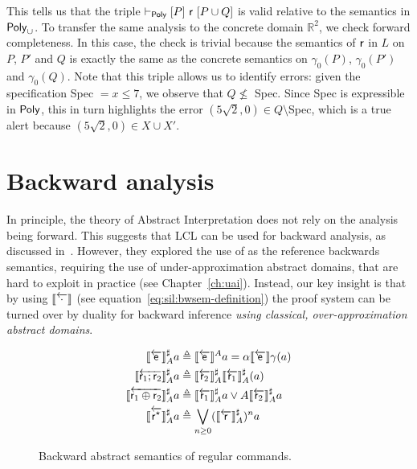 \begin{example}
	This tells us that the triple $\vdash_{\mathsf{Poly}}\nobreak[P]~\mathsf{r}~[P \cup Q]$ is valid relative to the semantics in $\mathsf{Poly}_{\cup}$. To transfer the same analysis to the concrete domain $\mathbb{R}^2$, we  check forward completeness. In this case, the check is trivial because the semantics of $\mathsf{r}$ in $L$ on $P$, $P'$ and $Q$ is exactly the same as the concrete semantics on $\gamma_0(P)$, $\gamma_0(P')$ and $\gamma_0(Q)$.
	Note that this triple allows us to identify errors: given the specification Spec $= x \le 7$, we observe that $Q \nleq $ Spec. Since Spec is expressible in $\mathsf{Poly}$, this in turn highlights the error $(5 \sqrt{2}, 0) \in Q \setminus $Spec, which is a true alert because $(5 \sqrt{2}, 0) \in X \cup X'$.
\end{example}

\section{Backward analysis}\label{sec:lcla:backward}
In principle, the theory of Abstract Interpretation does not rely on the analysis being forward. This suggests that LCL can be used for backward analysis, as discussed in~\cite[\S 5.3]{BGGR23}. However, they explored the use of \wlp{} as the reference backwards semantics, requiring the use of under\hyp{}approximation abstract domains, that are hard to exploit in practice (see Chapter~\ref{ch:uai}).
Instead, our key insight is that by using $\llbracket\overleftarrow{\cdot}\rrbracket$ (see equation~\eqref{eq:sil:bwsem-definition}) the proof system can be turned over by duality for backward inference \emph{using classical, over-approximation abstract domains}.

\begin{figure}
	\begin{align*}
		\llbracket\overleftarrow{\mathsf{e}}\rrbracket^{\sharp}_{A} a                    & \triangleq \llbracket\overleftarrow{\mathsf{e}}\rrbracket^{A} a = \alpha \llbracket\overleftarrow{\mathsf{e}}\rrbracket \gamma (a)                \\
		\llbracket\overleftarrow{\mathsf{r}_1 ; \mathsf{r}_2}\rrbracket^{\sharp}_{A} a        & \triangleq \llbracket\overleftarrow{\mathsf{r}_2}\rrbracket^{\sharp}_{A} \llbracket\overleftarrow{\mathsf{r}_1}\rrbracket^{\sharp}_{A} (a)        \\
		\llbracket\overleftarrow{\mathsf{r}_1 \oplus \mathsf{r}_2}\rrbracket^{\sharp}_{A} a & \triangleq \llbracket\overleftarrow{\mathsf{r}_1}\rrbracket^{\sharp}_{A} a \vee A \llbracket\overleftarrow{\mathsf{r}_2}\rrbracket^{\sharp}_{A} a \\
		\llbracket\overleftarrow{\mathsf{r}^\star}\rrbracket^{\sharp}_{A} a             & \triangleq \bigvee_{n \ge 0}  (\llbracket\overleftarrow{\mathsf{r}}\rrbracket^{\sharp}_{A})^n a
	\end{align*}
	\caption{Backward abstract semantics of regular commands.}
	\label{fig:lcla:regcom-abs-sem-bw}
\end{figure}

